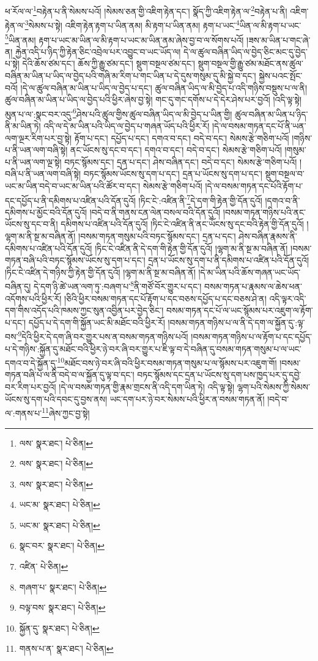 ཕ་རོལ་ལ་\footnote{ལས་  སྣར་ཐང་།  པེ་ཅིན། }བརྟེན་པ་ནི་སེམས་པའོ། །སེམས་ཅན་གྱི་འཇིག་རྟེན་དང་། སྣོད་ཀྱི་འཇིག་རྟེན་ལ་\footnote{ལས་  སྣར་ཐང་།  པེ་ཅིན། }བརྟེན་པ་ནི། འཇིག་རྟེན་ལ་\footnote{ལས་  སྣར་ཐང་།  པེ་ཅིན། }སེམས་པ་སྟེ། འཇིག་རྟེན་རྟག་པ་ཡིན་ནམ། མི་རྟག་པ་ཡིན་ནམ། རྟག་པ་ཡང་\footnote{ཡང་མ་  སྣར་ཐང་།  པེ་ཅིན། }ཡིན་ལ་མི་རྟག་པ་ཡང་\footnote{ཡང་མ་  སྣར་ཐང་།  པེ་ཅིན། }ཡིན་ནམ། རྟག་པ་ཡང་མ་ཡིན་ལ་མི་རྟག་པ་ཡང་མ་ཡིན་ནམ་ཞེས་བྱ་བ་ལ་སོགས་པའོ། །ཟས་མ་ཡིན་པ་གང་ཞེ་ན། རྐྱེན་འདི་པ་ཉིད་ཀྱི་རྟེན་ཅིང་འབྲེལ་པར་འབྱུང་བ་ཡང་ཡོད་ལ། དེ་ལ་ཚུལ་བཞིན་ཡིད་ལ་བྱེད་ཅིང་མང་དུ་བྱེད་པ་སྟེ། དེའི་ཆོས་ཙམ་དང་། ཆོས་ཀྱི་རྒྱུ་ཙམ་དང་། སྡུག་བསྔལ་ཙམ་དང་། སྡུག་བསྔལ་གྱི་རྒྱུ་ཙམ་མཐོང་ནས་ཚུལ་བཞིན་མ་ཡིན་པ་ཡིད་ལ་བྱེད་པའི་གཞི་མ་རིག་པ་གང་ཡིན་པ་དེ་དུས་གསུམ་དུ་མི་སྐྱེ་བ་དང་། སྐྱེས་པའང་སྤོང་བའོ། །དེ་ལ་ཚུལ་བཞིན་མ་ཡིན་པ་ཡིད་ལ་བྱེད་པ་དང་། ཚུལ་བཞིན་ཡིད་ལ་མི་བྱེད་པ་འདི་གཉིས་བསྡུས་པ་ལ་ནི། ཚུལ་བཞིན་མ་ཡིན་པ་ཡིད་ལ་བྱེད་པའི་ཕྱིར་ཞེས་བྱ་སྟེ། གང་དུ་གང་དགོས་པ་དེ་དེར་ཤེས་པར་བྱའོ། །འདི་ལྟ་སྟེ། མུན་པ་ལ་:སྣང་བར་འདུ་\footnote{སྣང་བར་  སྣར་ཐང་།  པེ་ཅིན། }ཤེས་པའི་ཚུལ་གྱིས་ཚུལ་བཞིན་ཡིད་ལ་མི་བྱེད་པ་ཡིན་གྱི། ཚུལ་བཞིན་མ་ཡིན་པ་ཉིད་ནི་མ་ཡིན་ཏེ། འདི་ལ་དེ་མ་ཡིན་པའི་ཡིད་ལ་བྱེད་པ་གཞན་ཡོད་པའི་ཕྱིར་རོ། །དེ་ལ་བསམ་གཏན་དང་པོ་ནི་ཡན་ལག་ལྔར་རིག་པར་བྱ་སྟེ། རྟོག་པ་དང་། དཔྱོད་པ་དང་། དགའ་བ་དང་། བདེ་བ་དང་། སེམས་རྩེ་གཅིག་པའོ། །གཉིས་པ་ནི་ཡན་ལག་བཞི་སྟེ། ནང་ཡོངས་སུ་དང་བ་དང་། དགའ་བ་དང་། བདེ་བ་དང་། སེམས་རྩེ་གཅིག་པའོ། །གསུམ་པ་ནི་ཡན་ལག་ལྔ་སྟེ། བཏང་སྙོམས་དང་། དྲན་པ་དང་། ཤེས་བཞིན་དང་། བདེ་བ་དང་། སེམས་རྩེ་གཅིག་པའོ། །བཞི་པ་ནི་ཡན་ལག་བཞི་སྟེ། བཏང་སྙོམས་ཡོངས་སུ་དག་པ་དང་། དྲན་པ་ཡོངས་སུ་དག་པ་དང་། སྡུག་བསྔལ་བ་ཡང་མ་ཡིན་བདེ་བ་ཡང་མ་ཡིན་པའི་ཚོར་བ་དང་། སེམས་རྩེ་གཅིག་པའོ། །དེ་ལ་བསམ་གཏན་དང་པོའི་རྟོག་པ་དང་དཔྱོད་པ་ནི་དམིགས་པ་འཛིན་པའི་དོན་དུའོ། །ཏིང་ངེ་:འཛིན་ནི་\footnote{འཛིན་  པེ་ཅིན། }དེ་དག་གི་རྟེན་གྱི་དོན་དུའོ། །དགའ་བ་ནི་དམིགས་པ་མྱོང་བའི་དོན་དུའོ། །བདེ་བ་ནི་གནས་ངན་ལེན་བསལ་བའི་དོན་དུའོ། །བསམ་གཏན་གཉིས་པའི་ནང་ཡོངས་སུ་དང་བ་ནི། དམིགས་པ་འཛིན་པའི་དོན་དུའོ། །ཏིང་ངེ་འཛིན་ནི་ནང་ཡོངས་སུ་དང་བའི་རྟེན་གྱི་དོན་དུའོ། །ལྷག་མ་ནི་སྔ་མ་བཞིན་ནོ། །བསམ་གཏན་གསུམ་པའི་བཏང་སྙོམས་དང་། དྲན་པ་དང་། ཤེས་བཞིན་རྣམས་ནི་དམིགས་པ་འཛིན་པའི་དོན་དུའོ། །ཏིང་ངེ་འཛིན་ནི་དེ་དག་གི་རྟེན་གྱི་དོན་དུའོ། །ལྷག་མ་ནི་སྔ་མ་བཞིན་ནོ། །བསམ་གཏན་བཞི་པའི་བཏང་སྙོམས་ཡོངས་སུ་དག་པ་དང་། དྲན་པ་ཡོངས་སུ་དག་པ་ནི་དམིགས་པ་འཛིན་པའི་དོན་དུའོ། །ཏིང་ངེ་འཛིན་དེ་གཉིས་ཀྱི་རྟེན་གྱི་དོན་དུའོ། །ལྷག་མ་ནི་སྔ་མ་བཞིན་ནོ། །དེ་མ་ཡིན་པའི་ཆོས་གཞན་ཡང་ཡོད་བཞིན་དུ། དེ་དག་ཉི་ཚེ་ཡན་ལག་ཏུ་:བཞག་པ་\footnote{གཞག་པ་  སྣར་ཐང་།  པེ་ཅིན། }ནི་གཙོ་བོར་གྱུར་པ་དང་། བསམ་གཏན་པ་རྣམས་ལ་ཆེས་ཕན་འདོགས་པའི་ཕྱིར་རོ། །ཅིའི་ཕྱིར་བསམ་གཏན་དང་པོ་རྟོག་པ་དང་བཅས་དཔྱོད་པ་དང་བཅས་ཤེ་ན། འདི་ལྟར་འདི་དག་གིས་འདོད་པའི་ཁམས་ཀྱང་སུན་འབྱིན་པར་བྱེད་ཅིང་། བསམ་གཏན་དང་པོ་ལ་ཡང་སྙོམས་པར་འཇུག་ལ་རྟོག་པ་དང་། དཔྱོད་པ་དེ་དག་གི་སྐྱོན་ཡང་མི་མཐོང་བའི་ཕྱིར་རོ། །བསམ་གཏན་གཉིས་པ་ལ་ནི་དེ་དག་ལ་སྐྱོན་དུ་:ལྟ་བས་\footnote{བལྟ་བས་  སྣར་ཐང་།  པེ་ཅིན། }དེའི་ཕྱིར་དེ་དག་ཞི་བར་གྱུར་པས་ན་བསམ་གཏན་གཉིས་པའོ། །བསམ་གཏན་གཉིས་པ་ལ་རྟོག་པ་དང་དཔྱོད་པ་དེ་གཉིས་:སྐྱོན་དུ་མཐོང་བའི་ཕྱིར་ཉེ་བར་ཞི་བར་གྱུར་པ་ཇི་ལྟ་བ་དེ་བཞིན་དུ་བསམ་གཏན་གསུམ་པ་ལ་ཡང་དགའ་བ་དེ་སྐྱོན་དུ་\footnote{སྐྱོན་དུ་  སྣར་ཐང་།  པེ་ཅིན། }མཐོང་བས་ཉེ་བར་ཞི་བའི་ཕྱིར་བསམ་གཏན་གསུམ་པ་ལ་སྙོམས་པར་འཇུག་གོ། །བསམ་གཏན་བཞི་པ་ལ་ནི་བདེ་བ་ལ་སྐྱོན་དུ་ལྟ་བ་དང་། བཏང་སྙོམས་དང་དྲན་པ་ཡོངས་སུ་དག་པས་ཁྱད་པར་དུ་དབྱེ་བར་རིག་པར་བྱའོ། །དེ་ལ་བསམ་གཏན་གྱི་རྣམ་གྲངས་ནི་འདི་དག་ཡིན་ཏེ། འདི་ལྟ་སྟེ། ལྷག་པའི་སེམས་ཀྱི་སེམས་ཡོངས་སུ་དག་པའི་དབང་དུ་བྱས་ནས། ཡང་དག་པར་ཉེ་བར་སེམས་པའི་ཕྱིར་ན་བསམ་གཏན་ནོ། །བདེ་བ་ལ་:གནས་པ་\footnote{གནས་པ་ན་  སྣར་ཐང་།  པེ་ཅིན། }ཞེས་ཀྱང་བྱ་སྟེ། 